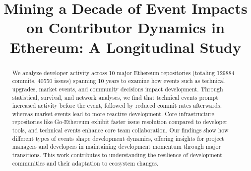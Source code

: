 \documentclass[conference]{IEEEtran}
\begin{document}



\title{Mining a Decade of Event Impacts on Contributor Dynamics in Ethereum: A Longitudinal Study}



\author{
}

\maketitle


\begin{abstract}
We analyze developer activity across 10 major Ethereum repositories (totaling 129884 commits, 40550 issues) spanning 10 years to examine how events such as technical upgrades, market events, and community decisions impact development. Through statistical, survival, and network analyses, we find that technical events prompt increased activity before the event, followed by reduced commit rates afterwards, whereas market events lead to more reactive development. Core infrastructure repositories like Go-Ethereum exhibit faster issue resolution compared to developer tools, and technical events enhance core team collaboration. 
Our findings show how different types of events shape development dynamics, offering insights for project managers and developers in maintaining development momentum through major transitions. This work contributes to understanding the resilience of development communities and their adaptation to ecosystem changes.
\end{abstract}
\end{document}

